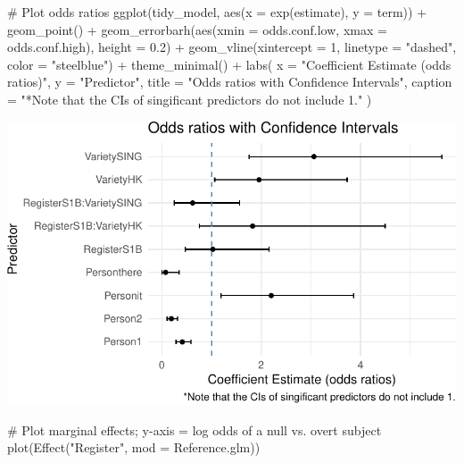 \documentclass[
  11pt,
  letterpaper,
  DIV=11,
  numbers=noendperiod]{scrreprt}
\newenvironment{Shaded}{\begin{snugshade}}{\end{snugshade}}
\newcommand{\AttributeTok}[1]{\textcolor[rgb]{0.40,0.45,0.13}{#1}}
\newcommand{\CommentTok}[1]{\textcolor[rgb]{0.37,0.37,0.37}{#1}}
\newcommand{\DecValTok}[1]{\textcolor[rgb]{0.68,0.00,0.00}{#1}}
\newcommand{\FloatTok}[1]{\textcolor[rgb]{0.68,0.00,0.00}{#1}}
\newcommand{\FunctionTok}[1]{\textcolor[rgb]{0.28,0.35,0.67}{#1}}
\newcommand{\NormalTok}[1]{\textcolor[rgb]{0.00,0.23,0.31}{#1}}
\newcommand{\SpecialCharTok}[1]{\textcolor[rgb]{0.37,0.37,0.37}{#1}}
\newcommand{\StringTok}[1]{\textcolor[rgb]{0.13,0.47,0.30}{#1}}
\begin{document}
\begin{Shaded}
\begin{Highlighting}[]
\CommentTok{\# Plot odds ratios}
\FunctionTok{ggplot}\NormalTok{(tidy\_model, }\FunctionTok{aes}\NormalTok{(}\AttributeTok{x =} \FunctionTok{exp}\NormalTok{(estimate), }\AttributeTok{y =}\NormalTok{ term)) }\SpecialCharTok{+}
  \FunctionTok{geom\_point}\NormalTok{() }\SpecialCharTok{+}
  \FunctionTok{geom\_errorbarh}\NormalTok{(}\FunctionTok{aes}\NormalTok{(}\AttributeTok{xmin =}\NormalTok{ odds.conf.low, }\AttributeTok{xmax =}\NormalTok{ odds.conf.high), }\AttributeTok{height =} \FloatTok{0.2}\NormalTok{) }\SpecialCharTok{+}
  \FunctionTok{geom\_vline}\NormalTok{(}\AttributeTok{xintercept =} \DecValTok{1}\NormalTok{, }\AttributeTok{linetype =} \StringTok{"dashed"}\NormalTok{, }\AttributeTok{color =} \StringTok{"steelblue"}\NormalTok{) }\SpecialCharTok{+}
  \FunctionTok{theme\_minimal}\NormalTok{() }\SpecialCharTok{+}
  \FunctionTok{labs}\NormalTok{(}
    \AttributeTok{x =} \StringTok{"Coefficient Estimate (odds ratios)"}\NormalTok{,}
    \AttributeTok{y =} \StringTok{"Predictor"}\NormalTok{,}
    \AttributeTok{title =} \StringTok{"Odds ratios with Confidence Intervals"}\NormalTok{,}
    \AttributeTok{caption =} \StringTok{"*Note that the CIs of singificant predictors do not include 1."}
\NormalTok{  )}
\end{Highlighting}
\end{Shaded}

\includegraphics{Logistic_regression_files/figure-pdf/unnamed-chunk-12-2.pdf}

\begin{Shaded}
\begin{Highlighting}[]
\CommentTok{\# Plot marginal effects; y{-}axis = log odds of a null vs. overt subject}
\FunctionTok{plot}\NormalTok{(}\FunctionTok{Effect}\NormalTok{(}\StringTok{"Register"}\NormalTok{, }\AttributeTok{mod =}\NormalTok{ Reference.glm)) }
\end{Highlighting}
\end{Shaded}
\end{document}
